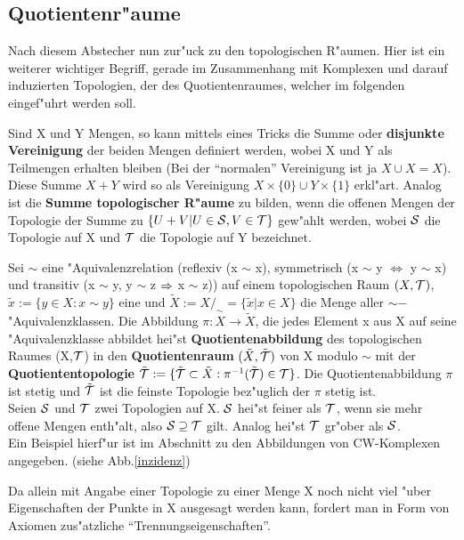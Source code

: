 \subsection{Quotientenr"aume}

Nach diesem Abstecher nun zur"uck zu den topologischen R"aumen. Hier ist
ein weiterer wichtiger Begriff, gerade im Zusammenhang mit Komplexen und
darauf induzierten Topologien, der des Quotientenraumes, welcher im folgenden
eingef"uhrt werden soll.

Sind X und Y Mengen, so kann mittels eines Tricks die Summe oder {\bf disjunkte
Vereinigung} der beiden
Mengen definiert werden, wobei X und Y als Teilmengen erhalten bleiben
(Bei der "`normalen"' Vereinigung ist ja $X\cup X = X$).
Diese Summe $X+Y$ wird so als Vereinigung $X\times \{0\} \cup Y\times \{1\}$
erkl"art. Analog ist die {\bf Summe topologischer R"aume} zu bilden,
wenn die offenen Mengen der Topologie der Summe zu
$\{U+V|U\in{\cal S},V\in{\cal T}\}$ gew"ahlt werden, wobei ${\cal S}$ die Topologie auf X und
${\cal T}$ die Topologie auf Y bezeichnet.

Sei $\sim$ eine "Aquivalenzrelation (reflexiv (x $\sim$ x), symmetrisch
(x $\sim$ y $\iff$ y $\sim$ x) und transitiv (x $\sim$ y, y $\sim$ z
$\Rightarrow$ x $\sim$ z)) auf einem topologischen Raum $(X,{\cal T})$,
$\tilde{x}:=\{y\in X:x\sim y\}$ eine und $\tilde{X}:=X/_\sim =
\{\tilde{x}|x\in X\}$ die Menge aller $\sim-$"Aquivalenzklassen. Die Abbildung
$\pi:X\to\tilde{X}$, die jedes Element x aus X auf seine "Aquivalenzklasse
abbildet hei"st {\bf Quotientenabbildung} des
topologischen Raumes (X,${\cal T}$) in den {\bf Quotientenraum}
$(\tilde{X},\tilde{{\cal T}})$  von X modulo $\sim$ mit der
{\bf Quotiententopologie}  $\tilde{{\cal T}} :=
\{\tilde{{\cal T}}\subset\tilde{X}:\pi^{-1}(\tilde{{\cal T}})\in{\cal T}\}$.
Die Quotientenabbildung $\pi$ ist stetig und $\tilde{{\cal T}}$ ist die feinste
Topologie bez"uglich der $\pi$ stetig ist.\\
{\scsi
Seien ${\cal S}$ und ${\cal T}$ zwei Topologien auf X. ${\cal S}$ hei"st feiner als ${\cal T}$,
wenn sie mehr offene Mengen enth"alt, also ${\cal S}\supseteq{\cal T}$ gilt. Analog
hei"st ${\cal T}$ gr"ober als ${\cal S}$.
}\\
Ein Beispiel hierf"ur ist im Abschnitt zu den Abbildungen von CW-Komplexen
angegeben. (siehe Abb.\ref{inzidenz})

Da allein mit Angabe einer Topologie zu einer Menge X noch nicht viel
"uber Eigenschaften der Punkte in X ausgesagt werden kann, fordert man
in Form von Axiomen zus"atzliche "`Trennungseigenschaften"'.

